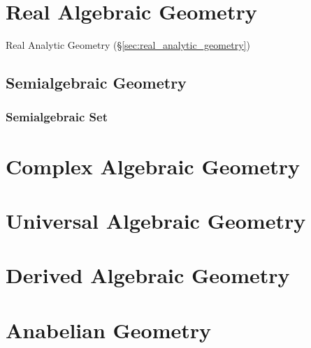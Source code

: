 \section{Real Algebraic Geometry}\label{sec:real_algebraic_geometry}

Real Analytic Geometry (\S\ref{sec:real_analytic_geometry})



\subsection{Semialgebraic Geometry}\label{sec:semialgebraic_geometry}

\subsubsection{Semialgebraic Set}\label{sec:semialgebraic_set}



\section{Complex Algebraic Geometry}
\label{sec:complex_algebraic_geometry}

\section{Universal Algebraic Geometry}\label{sec:universal_geometry}

\section{Derived Algebraic Geometry}
\label{sec:derived_algebraic_geometry}

\section{Anabelian Geometry}\label{sec:anabelian_geometry}
